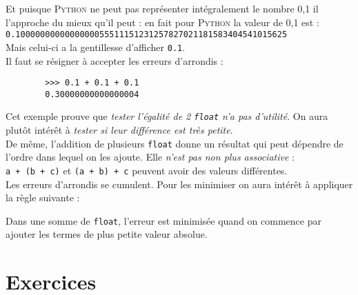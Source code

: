 Et puisque \textsc{Python} ne peut pas représenter intégralement le nombre 0,1 il l'approche du mieux qu'il peut : en fait pour \textsc{Python} la
valeur de 0,1 est :\\

\texttt{0.1000000000000000055511151231257827021181583404541015625}\\

Mais celui-ci a la gentillesse d'afficher \texttt{0.1}.\\

Il faut se résigner à accepter les erreurs d'arrondis :
\begin{pys}
    \begin{verbatim}
        >>> 0.1 + 0.1 + 0.1
        0.30000000000000004
    \end{verbatim}
\end{pys}

Cet exemple prouve que \textit{tester l'égalité de 2 \texttt{float} n'a pas d'utilité}. On aura plutôt intérêt à \textit{tester si leur différence est
    très petite}.\\

De même, l'addition de plusieurs \texttt{float} donne un résultat qui peut dépendre de l'ordre dans lequel on les ajoute.
Elle \textit{n'est pas non plus associative} : \\

\texttt{a + (b + c)} et \texttt{(a + b) + c} peuvent avoir des valeurs différentes.\\


Les erreurs d'arrondis se cumulent. Pour les minimiser on aura intérêt à appliquer la règle suivante :

\begin{propriete}
    Dans une somme de \texttt{float}, l'erreur est minimisée quand on commence par ajouter les termes de plus petite valeur absolue.
\end{propriete}

\section{Exercices}

